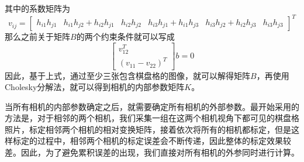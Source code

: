 其中的系数矩阵为
\begin{equation}
    v_{ij}=\left[ \begin{array}{cccccc} h_{i1}h_{j1} & h_{i1}h_{j2}+h_{i2}h_{j1} & h_{i2}h_{j2} & h_{i3}h_{j1}+h_{i1}h_{j3} & h_{i3}h_{j2}+h_{i2}h_{j3} & h_{i3}h_{j3} \end{array} \right]^T
\end{equation}
那么之前关于矩阵\(B\)的两个约束条件就可以写成
\begin{equation}
    \left[ \begin{array}{c} v^T_{12} \\ (v_{11}-v_{22})^T \end{array} \right]b=0
\end{equation}
因此，基于上式，通过至少三张包含棋盘格的图像，就可以解得矩阵\(B\)，再使用Cholesky分解法，就可以得到相机的内部参数矩阵\(K\)。


当所有相机的内部参数确定之后，就需要确定所有相机的外部参数。最开始采用的方法是，对于相邻的两个相机，我们采集一组在这两个相机视角下都可见的棋盘格照片，标定相邻两个相机的相对变换矩阵，接着依次将所有的相机都标定，但是这样标定的过程中，相邻两个相机的标定误差会不断传递，因此整体的标定效果较差。因此，为了避免累积误差的出现，我们直接对所有相机的外参同时进行计算。

